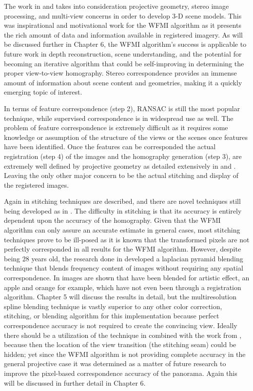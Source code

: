   The work in \cite{Walli2009} and \cite{Nilosek2009} takes into consideration projective geometry, stereo image processing, and multi-view concerns in order to develop 3-D scene models. This was inspirational and motivational work for the WFMI algorithm as it presents the rich amount of data and information available in registered imagery. As will be discussed further in Chapter 6, the WFMI algorithm's success is applicable to future work in depth reconstruction, scene understanding, and the potential for becoming an iterative algorithm that could be self-improving in determining the proper view-to-view homography. Stereo correspondence provides an immense amount of information about scene content and geometries, making it a quickly emerging topic of interest.
  
  In terms of feature correspondence (step 2), RANSAC \cite{Brown2007} is still the most popular technique, while supervised correspondence is in widespread use as well. The problem of feature correspondence is extremely difficult as it requires some knowledge or assumption of the structure of the views or the scenes once features have been identified. Once the features can be corresponded the actual  registration (step 4) of the images and the homography generation (step 3), are extremely well defined by projective geometry as detailed extensively in \cite{Faugeras2004} and \cite{Hartley2003}. Leaving the only other major concern to be the actual stitching and display of the registered images.
  
   Again in \cite{Zitova2003} stitching techniques are described, and there are novel techniques still being developed as in \cite{Haenselmann2009}. The difficulty in stitching is that its accuracy is entirely dependent upon the accuracy of the homography. Given that the WFMI algorithm can only assure an accurate estimate in general cases, most stitching techniques prove to be ill-posed as it is known that the transformed pixels are not perfectly corresponded in all results for the WFMI algorithm. However, despite being 28 years old, the research done in \cite{Burt1983} developed a laplacian pyramid blending technique that blends frequency content of images without requiring any spatial correspondence. In \cite{Burt1983} images are shown that have been blended for artistic effect, an apple and orange for example, which have not even been through a registration algorithm. Chapter 5 will discuss the results in detail, but the multiresolution spline blending technique is vastly superior to any other color correction, stitching, or blending algorithm for this implementation because perfect correspondence accuracy is not required to create the convincing view. Ideally there should be a utilization of the technique in \cite{Haenselmann2009} combined with the work from \cite{Burt1983}, because then the location of the view transition (the stitching seam) could be hidden; yet since the WFMI algorithm is not providing complete accuracy in the general projective case it was determined as a matter of future research to improve the pixel-based correspondence accuracy of the panorama. Again this will be discussed in further detail in Chapter 6.
   
